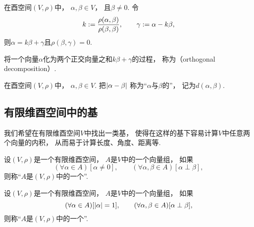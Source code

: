\begin{proposition}\label{theorem:酉空间.向量的正交分解}
在酉空间\((V,\rho)\)中，
\(\alpha,\beta \in V\)，
且\(\beta \neq 0\).
令\begin{equation*}
	k := \frac{\rho(\alpha,\beta)}{\rho(\beta,\beta)},
	\qquad
	\gamma := \alpha - k \beta,
\end{equation*}
则\(\alpha = k\beta + \gamma\)且\(\rho(\beta,\gamma) = 0\).
\end{proposition}
\begin{remark}
将一个向量\(\alpha\)化为两个正交向量之和\(k\beta + \gamma\)的过程，
称为（orthogonal decomposition）.
\end{remark}

\begin{definition}
在酉空间\((V,\rho)\)中，
\(\alpha,\beta \in V\).
把\(\abs{\alpha-\beta}\)
称为“\(\alpha\)与\(\beta\)的”，
记为\(d(\alpha,\beta)\).
\end{definition}

\subsection{有限维酉空间中的基}
我们希望在有限维酉空间\(V\)中找出一类基，
使得在这样的基下容易计算\(V\)中任意两个向量的内积，
从而易于计算长度、角度、距离等.

\begin{definition}
设\((V,\rho)\)是一个有限维酉空间，
\(A\)是\(V\)中的一个向量组，
如果\begin{equation*}
	(\forall \alpha \in A)
	[\alpha\neq0],
	\qquad
	(\forall \alpha,\beta \in A)
	[\alpha \perp \beta],
\end{equation*}
则称“\(A\)是\((V,\rho)\)中的一个”.
\end{definition}

\begin{definition}
设\((V,\rho)\)是一个有限维酉空间，
\(A\)是\(V\)中的一个向量组，
如果\begin{equation*}
	(\forall \alpha \in A)
	[\abs{\alpha} = 1],
	\qquad
	(\forall \alpha,\beta \in A)
	[\alpha \perp \beta],
\end{equation*}
则称“\(A\)是\((V,\rho)\)中的一个”.
\end{definition}

